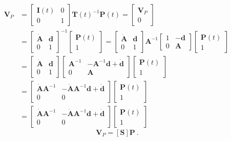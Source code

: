 \begin{equation}
\begin{aligned}
\mathbf{V}_P &= 
\begin{bmatrix}
\mathbf{I}(t) & 0 \\
0 & 1 
\end{bmatrix}
\mathbf{T}(t)^{-1} \mathbf{P}(t) = 
\begin{bmatrix}
\mathbf{V}_P \\
0
\end{bmatrix}\\
&= 
\begin{bmatrix}
\dot{\mathbf{A}} & \mathbf{d} \\
0 & 1 
\end{bmatrix}^{-1}
\begin{bmatrix}
\mathbf{P}(t) \\
1
\end{bmatrix} 
= 
\begin{bmatrix}
\dot{\mathbf{A}} & \mathbf{d} \\
0 & 1 
\end{bmatrix}
\mathbf{A}^{-1}
\begin{bmatrix}
1 & -\mathbf{d} \\
0 & \mathbf{A} 
\end{bmatrix}
\begin{bmatrix}
\mathbf{P}(t) \\
1
\end{bmatrix} \\
&= 
\begin{bmatrix}
\dot{\mathbf{A}} & \mathbf{d} \\
0 & 1 
\end{bmatrix}
\begin{bmatrix}
\mathbf{A}^{-1} & -\mathbf{A}^{-1}\mathbf{d} + \dot{\mathbf{d}} \\
0 & \mathbf{A} 
\end{bmatrix}
\begin{bmatrix}
\mathbf{P}(t) \\
1
\end{bmatrix} \\
&= 
\begin{bmatrix}
\dot{\mathbf{A}} \mathbf{A}^{-1} & -\dot{\mathbf{A}}\mathbf{A}^{-1}\mathbf{d} + \dot{\mathbf{d}} \\
0 & 0 
\end{bmatrix}
\begin{bmatrix}
\mathbf{P}(t) \\
1
\end{bmatrix} \\
&= 
\begin{bmatrix}
\dot{\mathbf{A}} \mathbf{A}^{-1} & -\dot{\mathbf{A}}\mathbf{A}^{-1}\mathbf{d} + \dot{\mathbf{d}} \\
0 & 0 
\end{bmatrix}
\begin{bmatrix}
\mathbf{P}(t) \\
1
\end{bmatrix}
\end{aligned}~
\end{equation}
\begin{equation}
\mathbf{V}_P =[\mathbf{S}]\mathbf{P}~.
\end{equation}

